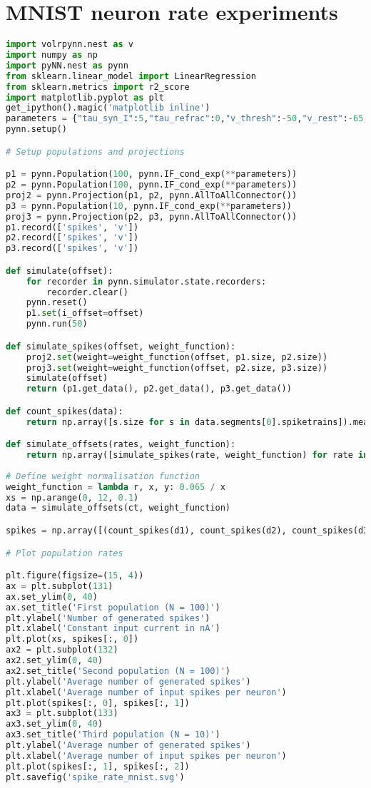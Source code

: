 \section{MNIST neuron rate experiments}
\begin{lstlisting}[language=Python]
import volrpynn.nest as v
import numpy as np
import pyNN.nest as pynn
from sklearn.linear_model import LinearRegression
from sklearn.metrics import r2_score
import matplotlib.pyplot as plt
get_ipython().magic('matplotlib inline')
parameters = {"tau_syn_I":5,"tau_refrac":0,"v_thresh":-50,"v_rest":-65,"tau_syn_E":5,"v_reset":-65,"tau_m":20,"e_rev_I":-70,"i_offset":0,"cm":1,"e_rev_E":0}
pynn.setup()

# Setup populations and projections 

p1 = pynn.Population(100, pynn.IF_cond_exp(**parameters))
p2 = pynn.Population(100, pynn.IF_cond_exp(**parameters))
proj2 = pynn.Projection(p1, p2, pynn.AllToAllConnector())
p3 = pynn.Population(10, pynn.IF_cond_exp(**parameters))
proj3 = pynn.Projection(p2, p3, pynn.AllToAllConnector())
p1.record(['spikes', 'v'])
p2.record(['spikes', 'v'])
p3.record(['spikes', 'v'])

def simulate(offset):
    for recorder in pynn.simulator.state.recorders:
        recorder.clear()
    pynn.reset()
    p1.set(i_offset=offset)
    pynn.run(50)

def simulate_spikes(offset, weight_function):
    proj2.set(weight=weight_function(offset, p1.size, p2.size))
    proj3.set(weight=weight_function(offset, p2.size, p3.size))
    simulate(offset)
    return (p1.get_data(), p2.get_data(), p3.get_data())

def count_spikes(data):
    return np.array([s.size for s in data.segments[0].spiketrains]).mean()

def simulate_offsets(rates, weight_function):
    return np.array([simulate_spikes(rate, weight_function) for rate in rates])
    
# Define weight normalisation function
weight_function = lambda r, x, y: 0.065 / x
xs = np.arange(0, 12, 0.1)
data = simulate_offsets(ct, weight_function)

spikes = np.array([(count_spikes(d1), count_spikes(d2), count_spikes(d3)) for (d1, d2, d3) in data])

# Plot population rates

plt.figure(figsize=(15, 4))
ax = plt.subplot(131)
ax.set_ylim(0, 40)
ax.set_title('First population (N = 100)')
plt.ylabel('Number of generated spikes')
plt.xlabel('Constant input current in nA')
plt.plot(xs, spikes[:, 0])
ax2 = plt.subplot(132)
ax2.set_ylim(0, 40)
ax2.set_title('Second population (N = 100)')
plt.ylabel('Average number of generated spikes')
plt.xlabel('Average number of input spikes per neuron')
plt.plot(spikes[:, 0], spikes[:, 1])
ax3 = plt.subplot(133)
ax3.set_ylim(0, 40)
ax3.set_title('Third population (N = 10)')
plt.ylabel('Average number of generated spikes')
plt.xlabel('Average number of input spikes per neuron')
plt.plot(spikes[:, 1], spikes[:, 2])
plt.savefig('spike_rate_mnist.svg')

\end{lstlisting}
